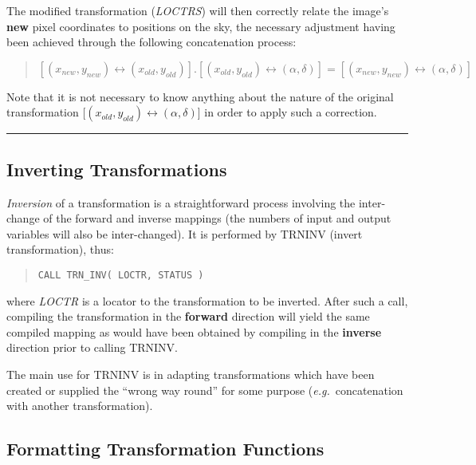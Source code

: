 \documentclass[twoside,11pt]{article}
\newcommand{\xlabel}[1]{}
\renewcommand{\_}{\texttt{\symbol{95}}}
\newcommand{\name}[1]{\mbox{\small{#1}}}
\newcommand{\fortvar}[1]{\mbox{\emph{#1}}}
\newcommand{\exampledone}[0]{\begin{center} \rule{6em}{0.2mm} \end{center}}
\begin{document}
The modified transformation (\fortvar{LOCTRS}\/) will then correctly relate
the image's \textbf{new} pixel coordinates to positions on the sky, the
necessary adjustment having been achieved through the following
concatenation process:

\begin{quote}
\begin{center}
$[(x_{new},y_{new}) \leftrightarrow (x_{old},y_{old})].[(x_{old},y_{old})
\leftrightarrow (\alpha,\delta)] = [(x_{new},y_{new}) \leftrightarrow
(\alpha,\delta)]$
\end{center}
\end{quote}

Note that it is not necessary to know anything about the nature of the
original transformation \mbox{[$(x_{old},y_{old}) \leftrightarrow
(\alpha,\delta)$]} in order to apply such a correction.
\exampledone


\subsection{\xlabel{inverting_transformations}Inverting Transformations}

\label{section:additional:inverting}

\emph{Inversion} of a transformation is a straightforward process involving
the inter-change of the forward and inverse mappings (the numbers of input
and output variables will also be inter-changed).
It is performed by \name{TRN\_INV} (invert transformation), thus:

\begin{quote}
\begin{verbatim}
CALL TRN_INV( LOCTR, STATUS )
\end{verbatim}
\end{quote}

where \fortvar{LOCTR} is a locator to the transformation to be inverted.
After such a call, compiling the transformation in the \textbf{forward}
direction will yield the same compiled mapping as would have been obtained
by compiling in the \textbf{ inverse} direction prior to calling
\name{TRN\_INV}.

The main use for \name{TRN\_INV} is in adapting transformations which have
been created or supplied the ``wrong way round'' for some purpose
(\emph{e.g.}\ concatenation with another transformation).


\subsection{\xlabel{formatting_transformation_functions}Formatting Transformation Functions}
\end{document}

